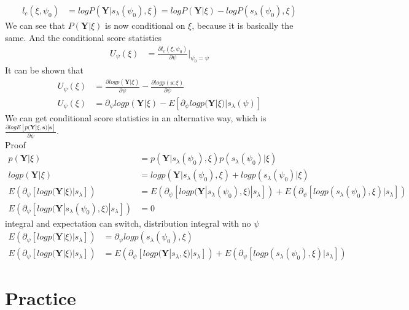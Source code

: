 \documentclass[11pt]{article} %
\begin{document}
\begin{align}
	l_c(\xi,\psi_0) &= log P(\textbf{Y}| s_{\lambda}(\psi_0), \xi) = log P(\textbf{Y}| \xi) - log P( s_{\lambda}(\psi_0), \xi)
\end{align}
We can see that $P(\textbf{Y}| \xi)$ is now conditional on $\xi$, because it is basically the same. And the conditional score statistics
\begin{align*}
	U_{\psi}(\xi) &= \frac{\partial l_c (\xi, \psi_0)}{\partial \psi}|_{\psi_0 = \psi}
\end{align*}
It can be shown that 
\begin{align*}
	U_{\psi}(\xi) &= \frac{\partial log p(\textbf{Y}| \xi)}{\partial \psi}  - \frac{\partial log p(\textbf{s}; \xi)}{\partial \psi} \\
	U_{\psi}(\xi) &= \partial_{\psi} log p(\textbf{Y}| \xi) - E[\partial_{\psi} log p(\textbf{Y}|\xi)| s_{\lambda}(\psi)]
\end{align*}
We can get conditional score statistics in an alternative way, which is $\frac{\partial log E[p(\textbf{Y}|\xi, \textbf{s})|\textbf{s}]}{\partial \psi}$.\\
Proof
\begin{align*}
	p(\textbf{Y}| \xi) &= p(\textbf{Y}|s_{\lambda}(\psi_0), \xi) p(s_{\lambda}(\psi_0) | \xi)\\
	log p(\textbf{Y}| \xi) &= log  p(\textbf{Y}|s_{\lambda}(\psi_0), \xi) + log p(s_{\lambda}(\psi_0) | \xi)\\
	E \left( \partial_{\psi}[log p(\textbf{Y}| \xi)| s_{\lambda}]\right) &= E \left(\partial_{\psi}[log  p(\textbf{Y}|s_{\lambda}(\psi_0), \xi)|s_{\lambda}]\right) + E \left(\partial_{\psi}[log p(s_{\lambda}(\psi_0), \xi)|s_{\lambda}]\right)\\
	E \left(\partial_{\psi}[log  p(\textbf{Y}|s_{\lambda}(\psi_0), \xi)|s_{\lambda}]\right) & = 0
\end{align*}
integral and expectation can switch, distribution integral with no $\psi$
\begin{align*}
	E \left( \partial_{\psi}[log p(\textbf{Y}| \xi)| s_{\lambda}]\right) &= \partial_{\psi}log p(s_{\lambda}(\psi_0),\xi)\\
	E \left( \partial_{\psi}[log p(\textbf{Y}| \xi)| s_{\lambda}]\right) &=  E \left( \partial_{\psi}[log p(\textbf{Y}| s_{\lambda},\xi)| s_{\lambda}]\right) + E \left(\partial_{\psi}[log p(s_{\lambda}(\psi_0), \xi)|s_{\lambda}]\right)
\end{align*}

\section{Practice}
\end{document}
